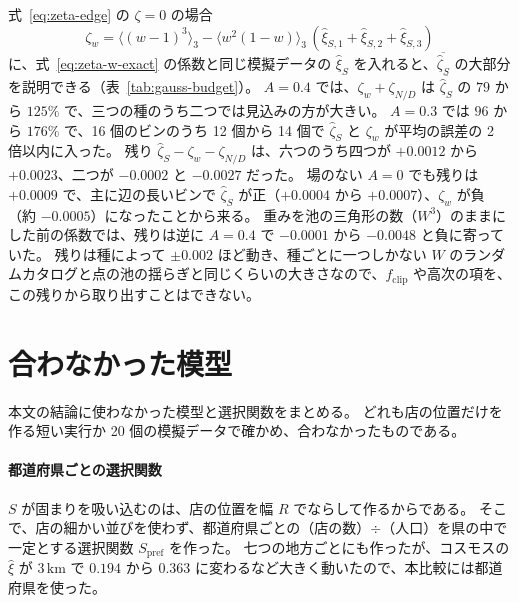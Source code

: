 \documentclass[a4paper,11pt]{ltjsarticle}
\begin{document}
式~\eqref{eq:zeta-edge} の $\zeta = 0$ の場合
\begin{equation}
  \zeta_w = \langle (w - 1)^3 \rangle_3 - \langle w^2 (1 - w) \rangle_3\, (\hat\xi_{S,1} + \hat\xi_{S,2} + \hat\xi_{S,3})
  \label{eq:zeta-w}
\end{equation}
に、式~\eqref{eq:zeta-w-exact} の係数と同じ模擬データの $\hat\xi_S$ を入れると、$\overline{\hat\zeta_S}$ の大部分を説明できる（表~\ref{tab:gauss-budget}）。
$A = 0.4$ では、$\zeta_w + \zeta_{N/D}$ は $\overline{\hat\zeta_S}$ の $79$ から $125\%$ で、三つの種のうち二つでは見込みの方が大きい。
$A = 0.3$ では $96$ から $176\%$ で、16 個のビンのうち 12 個から 14 個で $\hat\zeta_S$ と $\zeta_w$ が平均の誤差の 2 倍以内に入った。
残り $\hat\zeta_S - \zeta_w - \zeta_{N/D}$ は、六つのうち四つが $+0.0012$ から $+0.0023$、二つが $-0.0002$ と $-0.0027$ だった。
場のない $A = 0$ でも残りは $+0.0009$ で、主に辺の長いビンで $\hat\zeta_S$ が正（$+0.0004$ から $+0.0007$）、$\zeta_w$ が負（約 $-0.0005$）になったことから来る。
重みを池の三角形の数（$W^3$）のままにした前の係数では、残りは逆に $A = 0.4$ で $-0.0001$ から $-0.0048$ と負に寄っていた。
残りは種によって $\pm 0.002$ ほど動き、種ごとに一つしかない $W$ のランダムカタログと点の池の揺らぎと同じくらいの大きさなので、$f_{\mathrm{clip}}$ や高次の項を、この残りから取り出すことはできない。

\begin{table}[t]
  \centering
  \caption{$\zeta = 0$ のガウス場（幅 $10\,\mathrm{km}$、各 40 個）の $\hat\zeta_S$ の内訳（16 個のビンの平均）。
    $\zeta_w$ は式~\eqref{eq:zeta-w} を式~\eqref{eq:zeta-w-exact} の係数で求めたもので、$w$ は種 1 の点の池から求め、$\hat\xi_S$ は同じ模擬データの値。
    $\zeta_{N/D} = -\mathrm{Cov}(N, D)/\langle D \rangle^2 + \langle N \rangle \mathrm{Var}(D)/\langle D \rangle^3$。}
  \label{tab:gauss-budget}
  \small
  
\end{table}

\section{合わなかった模型}
\label{app:failed}

本文の結論に使わなかった模型と選択関数をまとめる。
どれも店の位置だけを作る短い実行か 20 個の模擬データで確かめ、合わなかったものである。

\paragraph{都道府県ごとの選択関数}
\label{sec:regional-selection}
$S$ が固まりを吸い込むのは、店の位置を幅 $R$ でならして作るからである。
そこで、店の細かい並びを使わず、都道府県ごとの（店の数）$\div$（人口）を県の中で一定とする選択関数 $S_{\mathrm{pref}}$ を作った。
七つの地方ごとにも作ったが、コスモスの $\hat\xi$ が $3\,\mathrm{km}$ で $0.194$ から $0.363$ に変わるなど大きく動いたので、本比較には都道府県を使った。
\end{document}
